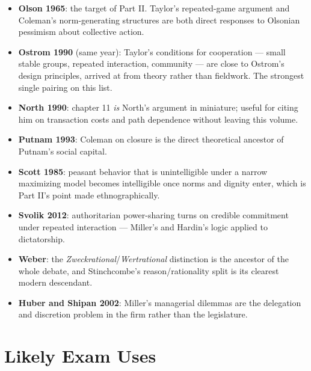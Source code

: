 \documentclass[12pt]{article}
\begin{document}
\begin{itemize}[leftmargin=*, itemsep=4pt]
    \item \textbf{Olson 1965}: the target of Part II. Taylor's repeated-game
    argument and Coleman's norm-generating structures are both direct responses
    to Olsonian pessimism about collective action.
    \item \textbf{Ostrom 1990} (same year): Taylor's conditions for cooperation
    --- small stable groups, repeated interaction, community --- are close to
    Ostrom's design principles, arrived at from theory rather than fieldwork.
    The strongest single pairing on this list.
    \item \textbf{North 1990}: chapter 11 \emph{is} North's argument in
    miniature; useful for citing him on transaction costs and path dependence
    without leaving this volume.
    \item \textbf{Putnam 1993}: Coleman on closure is the direct theoretical
    ancestor of Putnam's social capital.
    \item \textbf{Scott 1985}: peasant behavior that is unintelligible under a
    narrow maximizing model becomes intelligible once norms and dignity enter,
    which is Part II's point made ethnographically.
    \item \textbf{Svolik 2012}: authoritarian power-sharing turns on credible
    commitment under repeated interaction --- Miller's and Hardin's logic
    applied to dictatorship.
    \item \textbf{Weber}: the \textit{Zweckrational}/\textit{Wertrational}
    distinction is the ancestor of the whole debate, and Stinchcombe's
    reason/rationality split is its clearest modern descendant.
    \item \textbf{Huber and Shipan 2002}: Miller's managerial dilemmas are the
    delegation and discretion problem in the firm rather than the legislature.
\end{itemize}

\section{Likely Exam Uses}
\end{document}
